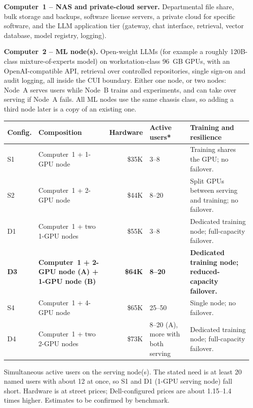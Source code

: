 
\textbf{Computer~1 -- NAS and private-cloud server.} Departmental file share,
bulk storage and backups, software license servers, a private cloud for specific
software, and the LLM application tier (gateway, chat interface, retrieval, vector
database, model registry, logging).

\textbf{Computer~2 -- ML node(s).} Open-weight LLMs (for example a roughly 120B-class
mixture-of-experts model) on workstation-class 96~GB GPUs, with an OpenAI-compatible
API, retrieval over controlled repositories, single sign-on and audit logging,
all inside the CUI boundary. Either one node, or two nodes: Node~A serves users while
Node~B trains and experiments, and can take over serving if Node~A fails. All ML
nodes use the same chassis class, so adding a third node later is a copy of an
existing one.

{\footnotesize
\begin{xltabular}{\textwidth}{@{}l Y{1.219} r Y{0.75} Y{1.031}@{}}
  \toprule
  Config. & Composition & Hardware & Active users* & Training and resilience \\
  \midrule
  \endhead
  S1 & Computer~1 + 1-GPU node & \$35K & 3--8 & Training shares the GPU; no failover. \\
  S2 & Computer~1 + 2-GPU node & \$44K & 8--20 & Split GPUs between serving and training; no failover. \\
  D1 & Computer~1 + two 1-GPU nodes & \$55K & 3--8 & Dedicated training node; full-capacity failover. \\
  \textbf{D3} & \textbf{Computer~1 + 2-GPU node (A) + 1-GPU node (B)} & \textbf{\$64K} & \textbf{8--20} & \textbf{Dedicated training node; reduced-capacity failover.} \\
  S4 & Computer~1 + 4-GPU node & \$65K & 25--50 & Single node; no failover. \\
  D4 & Computer~1 + two 2-GPU nodes & \$73K & 8--20 (A), more with both serving & Dedicated training node; full-capacity failover. \\
  \bottomrule
\end{xltabular}}
{\footnotesize * Simultaneous active users on the serving node(s). The stated need is at least 20 named users with about 12 at once, so S1 and D1 (1-GPU serving node) fall short. Hardware is at street prices; Dell-configured prices are about 1.15--1.4 times higher. Estimates to be confirmed by benchmark.}

